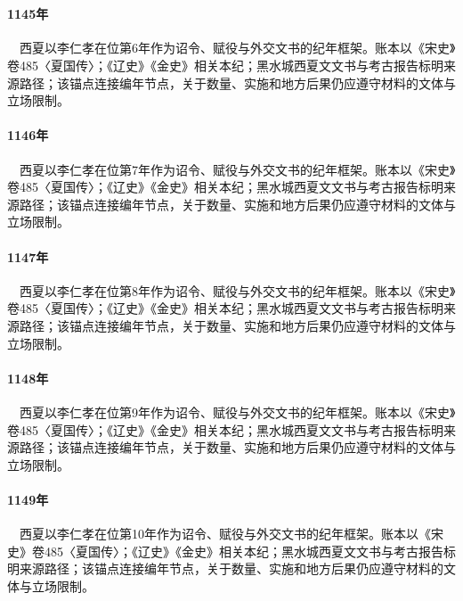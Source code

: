 \section{}

\paragraph{1145年}　西夏以李仁孝在位第6年作为诏令、赋役与外交文书的纪年框架。账本以《宋史》卷485〈夏国传〉；《辽史》《金史》相关本纪；黑水城西夏文文书与考古报告标明来源路径；该锚点连接编年节点，关于数量、实施和地方后果仍应遵守材料的文体与立场限制。

\paragraph{1146年}　西夏以李仁孝在位第7年作为诏令、赋役与外交文书的纪年框架。账本以《宋史》卷485〈夏国传〉；《辽史》《金史》相关本纪；黑水城西夏文文书与考古报告标明来源路径；该锚点连接编年节点，关于数量、实施和地方后果仍应遵守材料的文体与立场限制。

\paragraph{1147年}　西夏以李仁孝在位第8年作为诏令、赋役与外交文书的纪年框架。账本以《宋史》卷485〈夏国传〉；《辽史》《金史》相关本纪；黑水城西夏文文书与考古报告标明来源路径；该锚点连接编年节点，关于数量、实施和地方后果仍应遵守材料的文体与立场限制。

\paragraph{1148年}　西夏以李仁孝在位第9年作为诏令、赋役与外交文书的纪年框架。账本以《宋史》卷485〈夏国传〉；《辽史》《金史》相关本纪；黑水城西夏文文书与考古报告标明来源路径；该锚点连接编年节点，关于数量、实施和地方后果仍应遵守材料的文体与立场限制。

\paragraph{1149年}　西夏以李仁孝在位第10年作为诏令、赋役与外交文书的纪年框架。账本以《宋史》卷485〈夏国传〉；《辽史》《金史》相关本纪；黑水城西夏文文书与考古报告标明来源路径；该锚点连接编年节点，关于数量、实施和地方后果仍应遵守材料的文体与立场限制。

